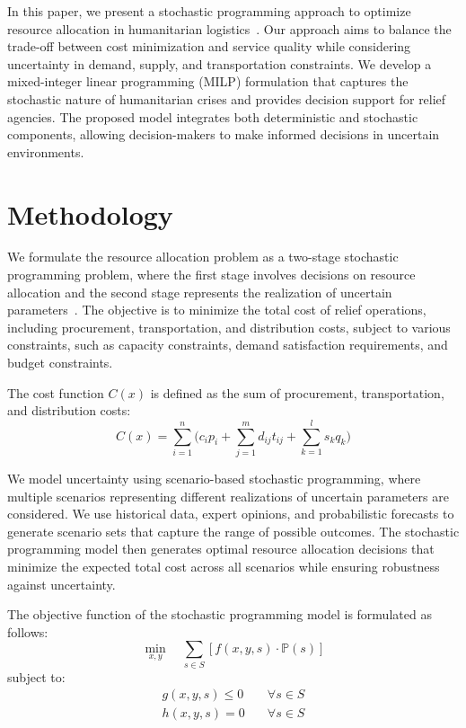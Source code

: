 \documentclass[ijds,sglanonrev]{informs4}
\begin{document}
In this paper, we present a stochastic programming approach to optimize resource allocation in humanitarian logistics~\citep{jones2010}. Our approach aims to balance the trade-off between cost minimization and service quality while considering uncertainty in demand, supply, and transportation constraints. We develop a mixed-integer linear programming (MILP) formulation that captures the stochastic nature of humanitarian crises and provides decision support for relief agencies. The proposed model integrates both deterministic and stochastic components, allowing decision-makers to make informed decisions in uncertain environments.

\section{Methodology}\label{sec:Method}
We formulate the resource allocation problem as a two-stage stochastic programming problem, where the first stage involves decisions on resource allocation and the second stage represents the realization of uncertain parameters~\citep{smith2005,jones2010,brown2015}. The objective is to minimize the total cost of relief operations, including procurement, transportation, and distribution costs, subject to various constraints, such as capacity constraints, demand satisfaction requirements, and budget constraints.

The cost function $C(x)$ is defined as the sum of procurement, transportation, and distribution costs:
\begin{equation}
C(x) = \sum_{i=1}^{n} \Biggl(c_i p_i + \sum_{j=1}^{m} d_{ij} t_{ij} + \sum_{k=1}^{l} s_k q_k\Biggr)
\end{equation}

We model uncertainty using scenario-based stochastic programming, where multiple scenarios representing different realizations of uncertain parameters are considered. We use historical data, expert opinions, and probabilistic forecasts to generate scenario sets that capture the range of possible outcomes. The stochastic programming model then generates optimal resource allocation decisions that minimize the expected total cost across all scenarios while ensuring robustness against uncertainty.

The objective function of the stochastic programming model is formulated as follows:
\begin{equation*}
\min_{x,y} \quad \sum_{s \in S} \left[ f(x, y, s) \cdot \mathbb{P}(s) \right]
\end{equation*}
subject to:
\begin{align}
g(x, y, s) \leq 0 &\quad \forall s \in S\\
h(x, y, s) = 0 &\quad \forall s \in S
\end{align}
\end{document}
